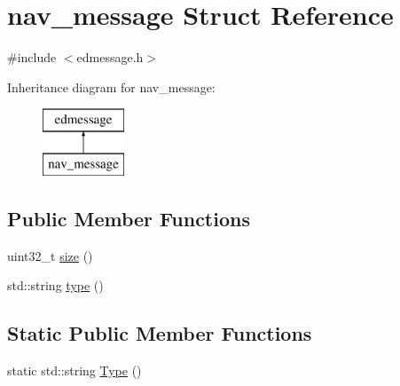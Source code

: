 \hypertarget{structnav__message}{\section{nav\-\_\-message Struct Reference}
\label{structnav__message}
}


{\ttfamily \#include $<$edmessage.\-h$>$}

Inheritance diagram for nav\-\_\-message\-:\begin{figure}[H]
\begin{center}
\leavevmode
\includegraphics[height=2.000000cm]{structnav__message}
\end{center}
\end{figure}
\subsection*{Public Member Functions}
\begin{DoxyCompactItemize}
\item 
uint32\-\_\-t \hyperlink{structnav__message_a0d38fb1c8e8c376f54fe75e75a172983}{size} ()
\item 
std\-::string \hyperlink{structnav__message_a71d65e9c6328a4f9d2393d010f5fe873}{type} ()
\end{DoxyCompactItemize}
\subsection*{Static Public Member Functions}
\begin{DoxyCompactItemize}
\item 
static std\-::string \hyperlink{structnav__message_af310709544394bf9ca4c09a8f0039c00}{Type} ()
\end{DoxyCompactItemize}
